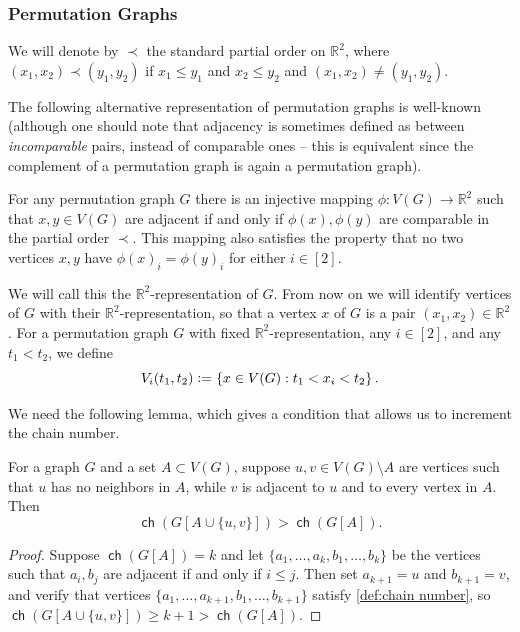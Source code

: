 \documentclass{article}
\newcommand{\define}{\vcentcolon=}
\newcommand{\bR}{\ensuremath{\mathbb{R}}}
\DeclareMathOperator\ch{\mathsf{ch}}
\begin{document}
\subsubsection{Permutation Graphs}
\label{section:permutation graphs}

We will denote by $\prec$ the standard partial order on $\bR^2$, where $(x_1,x_2) \prec (y_1,y_2)$ if $x_1 \leq y_1$ and $x_2 \leq y_2$ and $(x_1,x_2) \neq (y_1,y_2)$. 

The following alternative representation of permutation graphs is well-known (although one should
note that adjacency is sometimes defined as between \emph{incomparable} pairs, instead of comparable
ones -- this is equivalent since the complement of a permutation graph is again a permutation
graph).
\begin{proposition}
	For any permutation graph $G$ there is an injective mapping $\phi : V(G) \to \bR^2$ such that $x,y
	\in V(G)$ are adjacent if and only if $\phi(x),\phi(y)$ are comparable in the partial order $\prec$.
	This mapping also satisfies the property that no two vertices $x,y$ have $\phi(x)_i=\phi(y)_i$ for
	either $i \in [2]$.
\end{proposition}

We will call this the $\bR^2$-representation of $G$. From now on we will identify vertices of $G$
with their $\bR^2$-representation, so that a vertex $x$ of $G$ is a pair $(x_1,x_2) \in \bR^2$.  For
a permutation graph $G$ with fixed $\bR^2$-representation, any $i \in [2]$, and any $t_1 < t_2$, we
define
\[
V_i(t_1,t_2) \define \{ x \in V(G) : t_1 < x_i < t_2 \} \,.
\]

We need the following lemma, which gives a condition that allows us to
increment the chain number.

\begin{lemma}
	\label{lemma:increment chain number}
	For a graph $G$ and a set $A \subset V(G)$, suppose $u,v \in V(G) \setminus A$ are vertices such
	that $u$ has no neighbors in $A$, while $v$ is adjacent to $u$ and to every vertex in $A$. Then
	\[\ch(G[A \cup \{u,v\}]) > \ch(G[A]).\]
\end{lemma}
\begin{proof}
	Suppose $\ch(G[A])=k$ and
	let $\{ a_1, \dotsc, a_k, b_1, \dotsc, b_k\}$ be the vertices such that $a_i,b_j$ are adjacent if
	and only if $i \leq j$. Then set $a_{k+1} = u$ and $b_{k+1} = v$, and verify that
	vertices $\{a_1, \dotsc, a_{k+1}, b_1, \dotsc, b_{k+1}\}$ satisfy \cref{def:chain number}, so
	$\ch(G[A \cup \{u,v\}]) \geq k+1 > \ch(G[A])$.
\end{proof}
\end{document}
